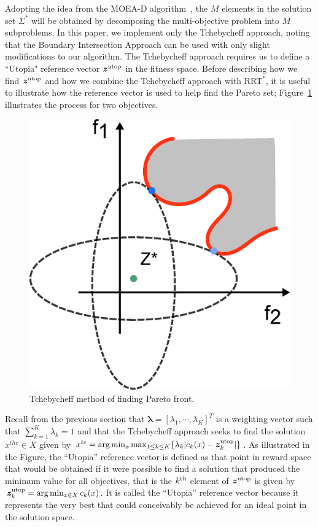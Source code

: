 \documentclass{article}
\begin{document}
Adopting the idea from the MOEA-D algorithm~\cite{4358754}, the $M$ elements in the solution set $\Sigma^{*}$ will be obtained by decomposing the multi-objective problem into $ M $ subproblems.  
In this paper, we implement only the Tchebycheff approach, noting that the Boundary Intersection Approach can be used with only slight modifications to our algorithm. The Tchebycheff approach requires us to define a ``Utopia" reference vector $ \bm{z}^{\rm utop} $ in the fitness space. 
Before describing how we find $ \bm{z}^{\rm utop} $ and how we combine the Tchebycheff approach with RRT$^{*}$, it is useful to illustrate how the reference vector is used to help find the Pareto set; Figure~\ref{fig:Tchebycheff} illustrates the process for two objectives.  
\begin{figure}
\centering
\includegraphics[width=0.6\linewidth]{fig/Tchebycheff2.png}
\caption{Tchebycheff method of finding Pareto front.}
\label{fig:Tchebycheff}
\end{figure}
Recall from the previous section that  $ \bm{\lambda} = [ \lambda_{1} , \cdots , \lambda_{K}  ]^{T} $ is a weighting vector such that $ \sum_{k=1}^{K} \lambda_{k} = 1 $ and that the Tchebycheff approach seeks to find the solution $ x^{the}\in X $ given by $ x^{te} = \arg\min_x \max_{1 \leq k \leq K}  \{ \lambda_{k} | c_{k}(x) - \bm{z}^{\rm utop}_{k}  | \} $.  
As illustrated in the Figure, the ``Utopia'' reference vector is defined as that point in reward space that would be obtained if it were possible to find a solution that produced the minimum value for all objectives, that is the $k^{\rm th}$ element of $\bm{z}^{\rm utop}$ is given by $\bm{z}^{\rm utop}_{k} = \arg \min_{x \in X} c_{k}(x)$.  
It is called the ``Utopia'' reference vector because it represents the very best that could conceivably be achieved for an ideal point in the solution space.
\end{document}
